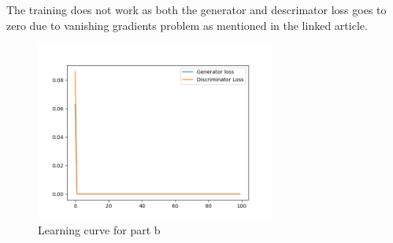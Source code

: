 \documentclass[a4paper]{article}
\theoremstyle{definition}
\newenvironment{soln}{
	\leavevmode\color{blue}\ignorespaces
}{}
\begin{document}
\begin{enumerate} [label=(\alph*)]
		\begin{soln} 
			The training does not work as both the generator and descrimator loss goes to zero due to vanishing gradients problem as mentioned in the linked article.
		
			\begin{figure}[H]
				\centering
				\includegraphics[width=0.7\textwidth]{outputs/b.loss.png}
				\caption{Learning curve for part b}
				\label{fig:gan_q1_loss}
			\end{figure}
			

\end{soln}
\end{enumerate}
\end{document}

